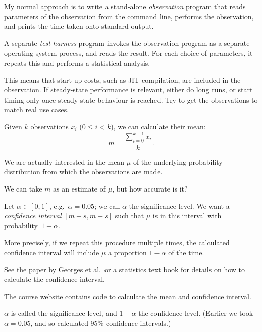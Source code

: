 
\begin{slide}

My normal approach is to write a stand-alone \emph{observation} program that
reads parameters of the observation from the command line, performs the
observation, and prints the time taken onto standard output.

A separate \emph{test harness} program invokes the observation program as a
separate operating system process, and reads the result.  For each choice of
parameters, it repeats this and performs a statistical analysis.

This means that start-up costs, such as JIT compilation, are included in the
observation.  If steady-state performance is relevant, either do long runs, or
start timing only once steady-state behaviour is reached.  Try to get the
observations to match real use cases.
\end{slide}


\begin{slide}

Given $k$ observations $x_i$ ($0 \le i < k$), we can calculate their mean:
\[
m = \frac{\sum_{i = 0}^{k-1} x_i}{k}.
\]

We are actually interested in the mean $\mu$ of the underlying probability
distribution from which the observations are made. 

We can take $m$ as an estimate of $\mu$, but how accurate is it?

Let $\alpha \in [0,1]$, e.g.\ $\alpha = 0.05$; we call $\alpha$ the
significance level.  We want a \emph{confidence interval} $[m-s, m+s]$ such
that $\mu$ is in this interval with probability~$1-\alpha$.

More precisely, if we repeat this procedure multiple times, the calculated
confidence interval will include $\mu$ a proportion $1-\alpha$ of the time. 
\end{slide}


\begin{slide}

See the paper by Georges et al.\ or a statistics text book for details on how
to calculate the confidence interval.  

The course website contains code to calculate the mean and confidence
interval. 

$\alpha$ is called the significance level, and $1-\alpha$ the confidence
level.  (Earlier we took $\alpha = 0.05$, and so calculated 95\% confidence
intervals.) 
\end{slide}

